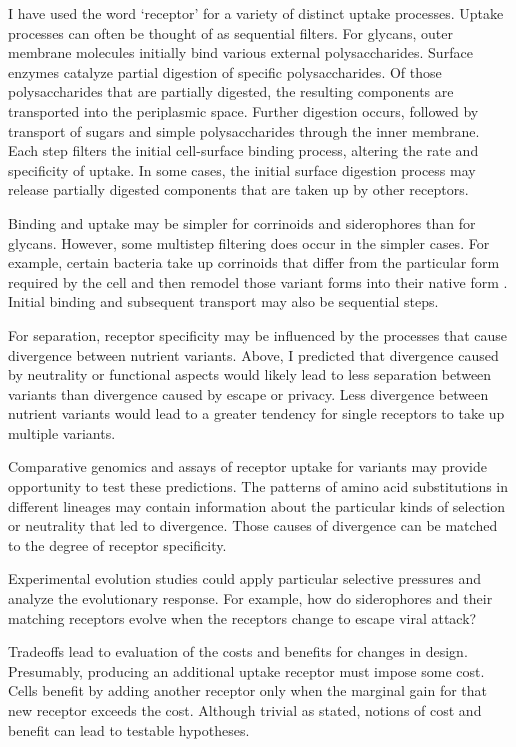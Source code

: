 \documentclass[\mydocfontsize]{article}
\begin{document}
\begin{multicols}{2}
 I have used the word `receptor' for a variety of distinct uptake processes. Uptake processes can often be thought of as sequential filters. For glycans, outer membrane molecules initially bind various external polysaccharides. Surface enzymes catalyze partial digestion of specific polysaccharides. Of those polysaccharides that are partially digested, the resulting components are transported into the periplasmic space. Further digestion occurs, followed by transport of sugars and simple polysaccharides through the inner membrane. Each step filters the initial cell-surface binding process, altering the rate and specificity of uptake. In some cases, the initial surface digestion process may release partially digested components that are taken up by other receptors.

Binding and uptake may be simpler for corrinoids and siderophores than for glycans. However, some multistep filtering does occur in the simpler cases. For example, certain bacteria take up corrinoids that differ from the particular form required by the cell and then remodel those variant forms into their native form \autocite{yi12versatility,mok13growth,keller14exogenous}. Initial binding and subsequent transport may also be sequential steps. 

 For separation, receptor specificity may be influenced by the processes that cause divergence between nutrient variants. Above, I predicted that divergence caused by neutrality or functional aspects would likely lead to less separation between variants than divergence caused by escape or privacy. Less divergence between nutrient variants would lead to a greater tendency for single receptors to take up multiple variants. 

Comparative genomics and assays of receptor uptake for variants may provide opportunity to test these predictions. The patterns of amino acid substitutions in different lineages may contain information about the particular kinds of selection or neutrality that led to divergence. Those causes of divergence can be matched to the degree of receptor specificity. 

Experimental evolution studies could apply particular selective pressures and analyze the evolutionary response. For example, how do siderophores and their matching receptors evolve when the receptors change to escape viral attack?

Tradeoffs lead to evaluation of the costs and benefits for changes in design. Presumably, producing an additional uptake receptor must impose some cost. Cells benefit by adding another receptor only when the marginal gain for that new receptor exceeds the cost. Although trivial as stated, notions of cost and benefit can lead to testable hypotheses. 


\end{multicols}
\end{document}

